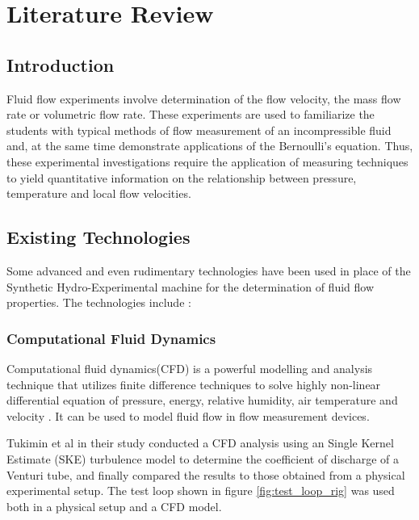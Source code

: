 \section{Literature Review}
\subsection{Introduction}
Fluid flow experiments involve determination of the flow velocity, the mass flow rate or volumetric flow rate. These experiments are used to familiarize the students with typical methods of flow measurement of an incompressible fluid and, at the same time demonstrate applications of the Bernoulli's equation. Thus, these experimental investigations require the application of measuring techniques to yield quantitative information on the relationship between pressure, temperature and local flow velocities. 


\subsection{Existing Technologies}
Some advanced and even rudimentary technologies have been used in place of the Synthetic Hydro-Experimental machine for the determination of fluid flow properties. The technologies include :   
\subsubsection{Computational Fluid Dynamics}
Computational fluid dynamics(CFD) is a powerful modelling and analysis technique that utilizes finite difference techniques to solve highly non-linear differential equation of pressure, energy, relative humidity, air temperature and velocity \cite{raman2018review}. It can be used to model fluid flow in flow measurement devices.
\par
Tukimin et al \cite{tukimin2016cfd} in their study  conducted a CFD analysis using an Single Kernel Estimate (SKE) turbulence model to determine the coefficient of discharge of a Venturi tube, and finally compared the results to those obtained from a physical experimental setup. The test loop shown in figure \ref{fig:test_loop_rig} was used both in a physical setup and a CFD model. 

